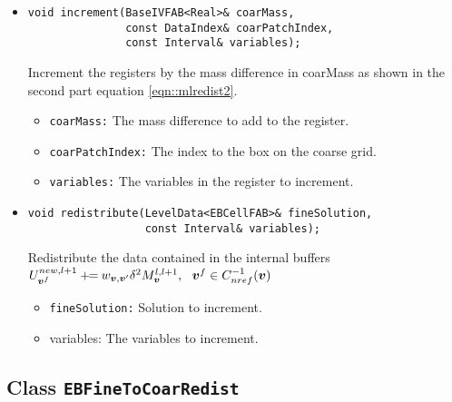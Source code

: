 \begin{itemize}
\item \begin{small}\begin{verbatim}
void increment(BaseIVFAB<Real>& coarMass,
               const DataIndex& coarPatchIndex,
               const Interval& variables);
\end{verbatim}\end{small}
Increment the registers by the mass difference
in coarMass as shown in the second part equation 
\ref{eqn::mlredist2}.
\begin{itemize}
\item \verb/coarMass:/  The mass difference to add to the register.
\item \verb/coarPatchIndex:/ The index to the box on the coarse grid. 
\item \verb/variables:/ The variables in the register to increment.
\end{itemize}

\item \begin{small}\begin{verbatim}
void redistribute(LevelData<EBCellFAB>& fineSolution,
                  const Interval& variables);
\end{verbatim}\end{small}
Redistribute the data contained in the internal buffers
$U^{new,l+1}_{{\boldsymbol{v}}^f} \mathbin{+\mkern-7mu=} w_{{\boldsymbol{v}},{\boldsymbol{v}}'}
\delta^2 M^{l, l+1}_{\boldsymbol{v}},~~{\boldsymbol{v}}^f \in C^{-1}_{nref}({\boldsymbol{v}})$
\begin{itemize}
\item {\tt fineSolution:} Solution to increment.
\item {variables:}  The variables to increment. 
\end{itemize}
\end{itemize}

\subsection{Class {\tt EBFineToCoarRedist}}

